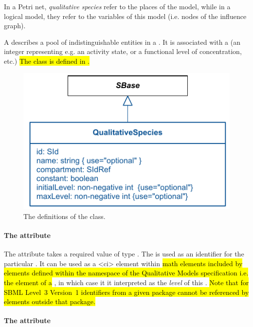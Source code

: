 In a Petri net, {\em qualitative species} refer to the places of the model, while in a logical model, they refer to the variables of this model (i.e. nodes of the influence graph).

A \QualitativeSpecies describes a pool of indistinguishable entities in a . It is associated with  a  (an integer representing e.g. an activity state, or a functional level of concentration, etc.)  %
 \hl{The \QualitativeSpecies class is defined in .}
\begin{figure}[h]
  \includegraphics{figs/qual-qualitative-species-uml.pdf}
  \caption{The definitions of the \QualitativeSpecies class. }
  \label{qual-qualitative-species-uml}
\end{figure}

\paragraph{The \fixttspace{} attribute}

The  attribute takes a required value
of type . The  is used as an identifier for the particular \QualitativeSpecies. It can be used as a 
<ci> element within \hl{math elements included by elements defined within the namespace of the Qualitative Models specification i.e. the  element of a \FunctionTerm}, in which case it it interpreted as the \emph{level} of this \QualitativeSpecies. \hl{Note that for SBML Level~3 Version~1 identifiers from a given package cannot be referenced by elements outside that package. }

\paragraph{The \fixttspace{} attribute}

